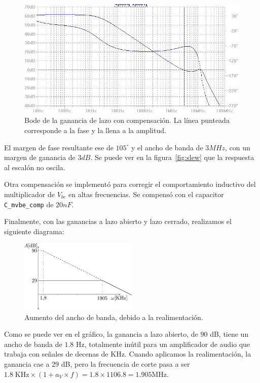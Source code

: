 \documentclass[a4paper,12pt,twoside]{article}
\begin{document}
\begin{figure}[H]
	\centering
	\includegraphics[height=0.4\textwidth]{img/sim/bode-la-con-comp}
	\caption{Bode de la ganancia de lazo con compensación. La línea punteada corresponde a la fase y la llena a la amplitud.}
	\label{fig:bode-la-con-comp}
\end{figure}


El margen de fase resultante ese de $105^{\circ}$ y el ancho de banda de $3MHz$, con un margen de ganancia de $3dB$. Se puede ver en la figura~\ref{fig:slew} que la respuesta al escalón no oscila.

Otra compensación se implementó para corregir el comportamiento inductivo del multiplicador de $V_{be}$ en altas frecuencias. Se compensó con el capacitor \texttt{C\_mvbe\_comp} de $20nF$.

Finalmente, con las ganancias a lazo abierto y lazo cerrado, realizamos el siguiente diagrama:

\begin{figure}[H]
	\centering
	\includegraphics[width=0.5\textwidth]{img/bodecompensado}
	\caption{Aumento del ancho de banda, debido a la realimentación.}
	\label{fig:bode-copmensado}
\end{figure}

Como se puede ver en el gráfico, la ganancia a lazo abierto, de $90$ dB, tiene un ancho de banda de $1.8$ Hz, totalmente inútil para un amplificador de audio que trabaja con señales de decenas de KHz. Cuando aplicamos la realimentación, la ganancia cae a $29$ dB, pero la frecuencia de corte pasa a ser $1.8\; \mathrm{KHz} \times (1 + a_V \times f) = 1.8 \times 1106.8 = 1.905 \mathrm{MHz}$.
\end{document}
